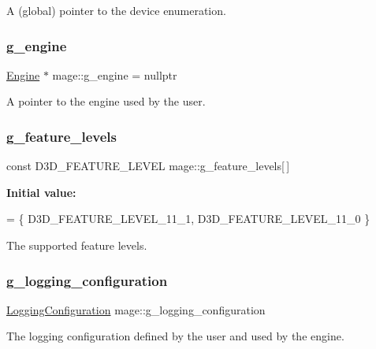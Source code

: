 A (global) pointer to the device enumeration. \hypertarget{namespacemage_a84bf83f1e8779d884452cdf08f56c19a}{}\label{namespacemage_a84bf83f1e8779d884452cdf08f56c19a} 
\subsubsection{\texorpdfstring{g\+\_\+engine}{g\_engine}}
{\footnotesize\ttfamily \hyperlink{classmage_1_1_engine}{Engine} $\ast$ mage\+::g\+\_\+engine = nullptr}

A pointer to the engine used by the user. \hypertarget{namespacemage_add3b7e051df553262371e077d9d66fd9}{}\label{namespacemage_add3b7e051df553262371e077d9d66fd9} 
\subsubsection{\texorpdfstring{g\+\_\+feature\+\_\+levels}{g\_feature\_levels}}
{\footnotesize\ttfamily const D3\+D\+\_\+\+F\+E\+A\+T\+U\+R\+E\+\_\+\+L\+E\+V\+EL mage\+::g\+\_\+feature\+\_\+levels\mbox{[}$\,$\mbox{]}}

{\bfseries Initial value\+:}
\begin{DoxyCode}
= \{
        D3D\_FEATURE\_LEVEL\_11\_1,
        D3D\_FEATURE\_LEVEL\_11\_0
    \}
\end{DoxyCode}
The supported feature levels. \hypertarget{namespacemage_a162413669f92d91c7ee135d60f93fcf1}{}\label{namespacemage_a162413669f92d91c7ee135d60f93fcf1} 
\subsubsection{\texorpdfstring{g\+\_\+logging\+\_\+configuration}{g\_logging\_configuration}}
{\footnotesize\ttfamily \hyperlink{structmage_1_1_logging_configuration}{Logging\+Configuration} mage\+::g\+\_\+logging\+\_\+configuration}

The logging configuration defined by the user and used by the engine. \hypertarget{namespacemage_a5a4e11b65061c618b85826ab6df480e0}{}\label{namespacemage_a5a4e11b65061c618b85826ab6df480e0} 
